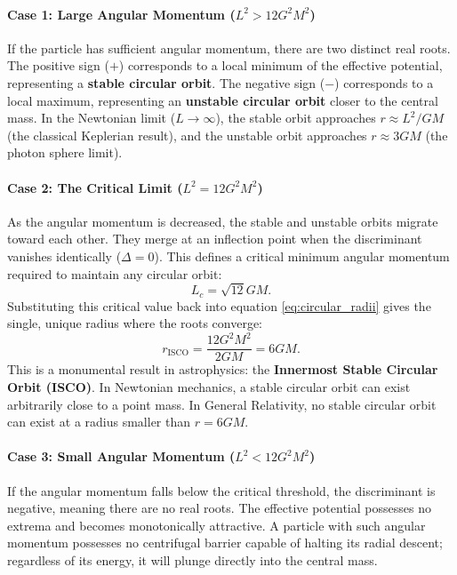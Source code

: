 \documentclass[11pt, a4paper]{report}
\begin{document}
\paragraph{Case 1: Large Angular Momentum ($L^{2} > 12G^{2}M^{2}$)}
If the particle has sufficient angular momentum, there are two distinct real roots. The positive sign ($+$) corresponds to a local minimum of the effective potential, representing a \textbf{stable circular orbit}. The negative sign ($-$) corresponds to a local maximum, representing an \textbf{unstable circular orbit} closer to the central mass. In the Newtonian limit ($L \to \infty$), the stable orbit approaches $r \approx L^{2}/GM$ (the classical Keplerian result), and the unstable orbit approaches $r \approx 3GM$ (the photon sphere limit).

\paragraph{Case 2: The Critical Limit ($L^{2} = 12G^{2}M^{2}$)}
As the angular momentum is decreased, the stable and unstable orbits migrate toward each other. They merge at an inflection point when the discriminant vanishes identically ($\Delta = 0$). This defines a critical minimum angular momentum required to maintain any circular orbit:
\begin{equation}
L_{c} = \sqrt{12}GM.
\end{equation}
Substituting this critical value back into equation \eqref{eq:circular_radii} gives the single, unique radius where the roots converge:
\begin{equation}
r_{\text{ISCO}} = \frac{12G^{2}M^{2}}{2GM} = 6GM.
\end{equation}
This is a monumental result in astrophysics: the \textbf{Innermost Stable Circular Orbit (ISCO)}. In Newtonian mechanics, a stable circular orbit can exist arbitrarily close to a point mass. In General Relativity, no stable circular orbit can exist at a radius smaller than $r = 6GM$. 

\paragraph{Case 3: Small Angular Momentum ($L^{2} < 12G^{2}M^{2}$)}
If the angular momentum falls below the critical threshold, the discriminant is negative, meaning there are no real roots. The effective potential possesses no extrema and becomes monotonically attractive. A particle with such angular momentum possesses no centrifugal barrier capable of halting its radial descent; regardless of its energy, it will plunge directly into the central mass.
\end{document}
